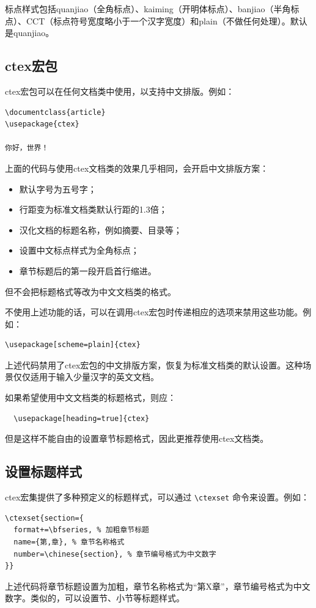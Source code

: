 标点样式包括quanjiao（全角标点）、kaiming（开明体标点）、banjiao（半角标点）、CCT（标点符号宽度略小于一个汉字宽度）和plain（不做任何处理）。默认是quanjiao。

\subsection{ctex宏包}
ctex宏包可以在任何文档类中使用，以支持中文排版。例如：
\begin{verbatim}
\documentclass{article}
\usepackage{ctex}

你好，世界！

\end{verbatim}

上面的代码与使用ctex文档类的效果几乎相同，会开启中文排版方案：
\begin{itemize}
  \item 默认字号为五号字；
  \item 行距变为标准文档类默认行距的1.3倍；
  \item 汉化文档的标题名称，例如摘要、目录等；
  \item 设置中文标点样式为全角标点；
  \item 章节标题后的第一段开启首行缩进。
\end{itemize}
但不会把标题格式等改为中文文档类的格式。

不使用上述功能的话，可以在调用ctex宏包时传递相应的选项来禁用这些功能。例如：
\begin{verbatim}
\usepackage[scheme=plain]{ctex}
\end{verbatim}
上述代码禁用了ctex宏包的中文排版方案，恢复为标准文档类的默认设置。这种场景仅仅适用于输入少量汉字的英文文档。

如果希望使用中文文档类的标题格式，则应：
\begin{verbatim}
  \usepackage[heading=true]{ctex}
\end{verbatim}
但是这样不能自由的设置章节标题格式，因此更推荐使用ctex文档类。

\subsection{设置标题样式}

ctex宏集提供了多种预定义的标题样式，可以通过 \verb|\ctexset| 命令来设置。例如：
\begin{verbatim}
\ctexset{section={
  format+=\bfseries, % 加粗章节标题
  name={第,章}, % 章节名称格式
  number=\chinese{section}, % 章节编号格式为中文数字
}}
\end{verbatim}
上述代码将章节标题设置为加粗，章节名称格式为“第X章”，章节编号格式为中文数字。类似的，可以设置节、小节等标题样式。

